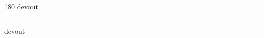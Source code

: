 
\begin{frame}
\begin{center}
\begin{turn}{180}
{\fontsize{2.5cm}{1em}\selectfont devout}
\end{turn}
\vspace{1em}\par  
\hrule
\vspace{1em}\par  
{\fontsize{2.5cm}{1em}\selectfont devout}
\end{center}
\end{frame}
